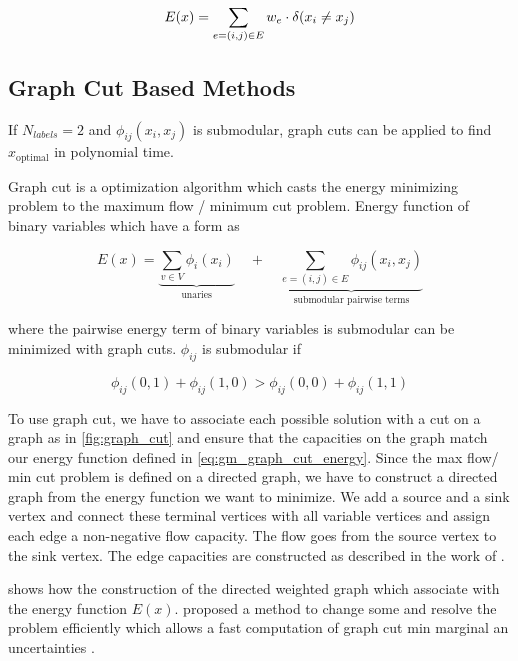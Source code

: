 \begin{align}
E(x)=
    \sum_{ e=(i,j) \in E}
        w_e \cdot \delta( x_i \neq x_j )
    \label{eq:gm_ef_max_cut}
\end{align}




\subsection{Graph Cut Based Methods}

If $N_{labels}=2$ and $\phi_{ij}(x_i,x_j)$ is submodular, 
graph cuts \cite{boykov_2001_pami,kolmogorov_2004_pami} can be applied to find $x_{\text{optimal}}$
in polynomial time.

Graph cut is a optimization algorithm which casts the energy minimizing problem
to the maximum flow / minimum cut problem. Energy function of binary variables which
have a form as 

\begin{equation} \label{eq:gm_graph_cut_energy}
    E(x) = 
    \underbrace{
        \sum_{v \in V} \phi_i(x_i)
    }_{\text{unaries}}
     \quad +  \quad
    \underbrace{
        \sum_{e=(i,j) \in E } \phi_{ij}(x_i,x_j) 
    }_{\text{submodular pairwise terms}}
\end{equation}



where the pairwise energy term of binary variables is submodular can be minimized with
graph cuts. $\phi_{ij}$ is submodular if

\begin{equation} \label{eq:gm_submodular_criterion}
    \phi_{ij}(0,1) + \phi_{ij}(1,0) >  \phi_{ij}(0,0) + \phi_{ij}(1,1)
\end{equation}

To use graph cut, we have to associate each possible solution with a cut on a graph as in
\cref{fig:graph_cut} and ensure that the capacities on the graph match our energy function 
defined in \cref{eq:gm_graph_cut_energy}.
Since the max flow/ min cut problem is defined on a directed graph, we have to construct
a directed graph from the energy function we want to minimize. We add a source and a
sink vertex and connect these terminal vertices with all variable vertices and assign
each edge a non-negative flow capacity. The flow goes from the source vertex to the
sink vertex. The edge capacities are constructed as described in the work of
\citet{kolmogorov_2004_pami}.

 shows how the
construction of the directed weighted graph which associate with the energy function $E(x)$.
\citet{kohli_2007_pami} proposed a method to change some and resolve
the problem efficiently which allows a fast computation
of graph cut min marginal an uncertainties \citep{kohli_2006_eccv,tarlow_2012_cvpr}.


